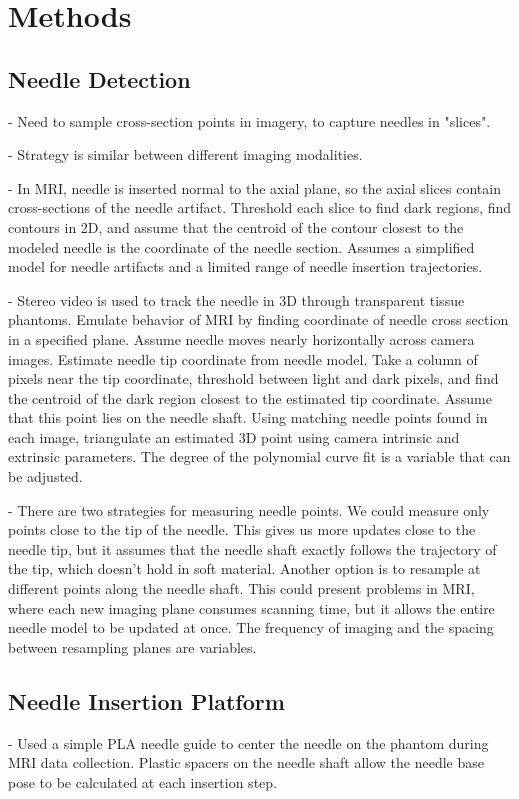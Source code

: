 \section{Methods}



\subsection{Needle Detection}
- Need to sample cross-section points in imagery, to capture needles in "slices".

- Strategy is similar between different imaging modalities.

- In MRI, needle is inserted normal to the axial plane, so the axial slices contain cross-sections of the needle artifact. Threshold each slice to find dark regions, find contours in 2D, and assume that the centroid of the contour closest to the modeled needle is the coordinate of the needle section. Assumes a simplified model for needle artifacts and a limited range of needle insertion trajectories.

- Stereo video is used to track the needle in 3D through transparent tissue phantoms. Emulate behavior of MRI by finding coordinate of needle cross section in a specified plane. Assume needle moves nearly horizontally across camera images. Estimate needle tip coordinate from needle model. Take a column of pixels near the tip coordinate, threshold between light and dark pixels, and find the centroid of the dark region closest to the estimated tip coordinate. Assume that this point lies on the needle shaft. Using matching needle points found in each image, triangulate an estimated 3D point using camera intrinsic and extrinsic parameters. The degree of the polynomial curve fit is a variable that can be adjusted.

- There are two strategies for measuring needle points. We could measure only points close to the tip of the needle. This gives us more updates close to the needle tip, but it assumes that the needle shaft exactly follows the trajectory of the tip, which doesn't hold in soft material. Another option is to resample at different points along the needle shaft. This could present problems in MRI, where each new imaging plane consumes scanning time, but it allows the entire needle model to be updated at once. The frequency of imaging and the spacing between resampling planes are variables.

\subsection{Needle Insertion Platform}
- Used a simple PLA needle guide to center the needle on the phantom during MRI data collection. Plastic spacers on the needle shaft allow the needle base pose to be calculated at each insertion step.

